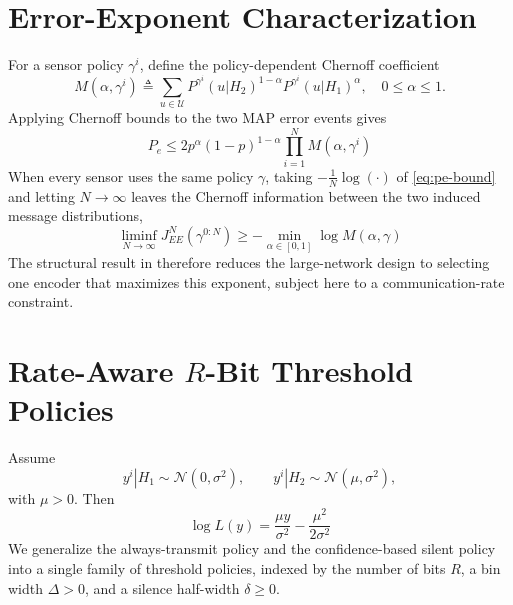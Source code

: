 \documentclass[conference]{IEEEtran}
\begin{document}
\section{Error-Exponent Characterization}
For a sensor policy $\gamma^i$, define the policy-dependent Chernoff
coefficient
\begin{equation}
 M(\alpha,\gamma^i) \triangleq \sum_{u\in\mathcal{U}}
 P^{\gamma^i}(u|H_2)^{1-\alpha}
 P^{\gamma^i}(u|H_1)^{\alpha},
 \quad 0\le\alpha\le1.
 \label{eq:chernoff-coefficient}
\end{equation}
Applying Chernoff bounds to the two MAP error events gives
\begin{equation}
 P_e\le 2p^{\alpha}(1-p)^{1-\alpha}
 \prod_{i=1}^{N}M(\alpha,\gamma^i)
 \label{eq:pe-bound}
\end{equation}
When every sensor uses the same policy $\gamma$, taking
$-\tfrac{1}{N}\log(\cdot)$ of \eqref{eq:pe-bound} and letting
$N\to\infty$ leaves the Chernoff information between the two induced
message distributions,
\begin{equation}
 \liminf_{N\to\infty}J^N_{EE}(\gamma^{0:N})
 \ge -\min_{\alpha\in[0,1]}\log M(\alpha,\gamma)
 \label{eq:identical-exponent}
\end{equation}
The structural result in \cite{Sanjari2025} therefore reduces the
large-network design to selecting one encoder that maximizes this
exponent, subject here to a communication-rate constraint.

\section{Rate-Aware $R$-Bit Threshold Policies}
Assume
\begin{equation}
 y^i|H_1\sim\mathcal{N}(0,\sigma^2),\qquad
 y^i|H_2\sim\mathcal{N}(\mu,\sigma^2),
 \label{eq:gaussian-model}
\end{equation}
with $\mu>0$.  Then
\begin{equation}
 \log L(y)=\frac{\mu y}{\sigma^2}-\frac{\mu^2}{2\sigma^2}
 \label{eq:gaussian-llr}
\end{equation}
We generalize the always-transmit policy and the confidence-based silent
policy into a single family of threshold policies, indexed by the number of
bits $R$, a bin width $\Delta>0$, and a silence half-width $\delta\ge0$.
\end{document}
